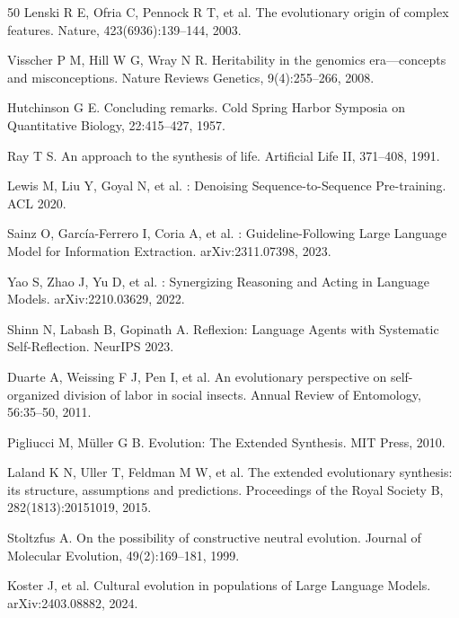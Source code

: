 \documentclass[twocolumn,10.5pt]{ctexart}
\begin{document}
\begin{thebibliography}{50}
Lenski R E, Ofria C, Pennock R T, et al.
\newblock The evolutionary origin of complex features.
\newblock Nature, 423(6936):139--144, 2003.

Visscher P M, Hill W G, Wray N R.
\newblock Heritability in the genomics era---concepts and misconceptions.
\newblock Nature Reviews Genetics, 9(4):255--266, 2008.

Hutchinson G E.
\newblock Concluding remarks.
\newblock Cold Spring Harbor Symposia on Quantitative Biology, 22:415--427, 1957.

Ray T S.
\newblock An approach to the synthesis of life.
\newblock Artificial Life II, 371--408, 1991.

Lewis M, Liu Y, Goyal N, et al.
: Denoising Sequence-to-Sequence Pre-training.
\newblock ACL 2020.

Sainz O, Garc{\'i}a-Ferrero I, Coria A, et al.
: Guideline-Following Large Language Model for Information Extraction.
\newblock arXiv:2311.07398, 2023.

Yao S, Zhao J, Yu D, et al.
: Synergizing Reasoning and Acting in Language Models.
\newblock arXiv:2210.03629, 2022.

Shinn N, Labash B, Gopinath A.
\newblock Reflexion: Language Agents with Systematic Self-Reflection.
\newblock NeurIPS 2023.

Duarte A, Weissing F J, Pen I, et al.
\newblock An evolutionary perspective on self-organized division of labor in social insects.
\newblock Annual Review of Entomology, 56:35--50, 2011.

Pigliucci M, M{\"u}ller G B.
\newblock Evolution: The Extended Synthesis.
\newblock MIT Press, 2010.

Laland K N, Uller T, Feldman M W, et al.
\newblock The extended evolutionary synthesis: its structure, assumptions and predictions.
\newblock Proceedings of the Royal Society B, 282(1813):20151019, 2015.

Stoltzfus A.
\newblock On the possibility of constructive neutral evolution.
\newblock Journal of Molecular Evolution, 49(2):169--181, 1999.

Koster J, et al.
\newblock Cultural evolution in populations of Large Language Models.
\newblock arXiv:2403.08882, 2024.


\end{thebibliography}
\end{document}

